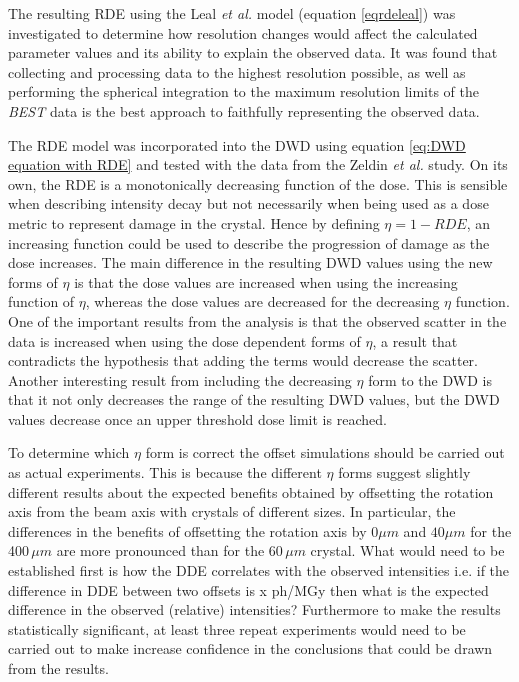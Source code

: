 The resulting RDE using the Leal \textit{et al.}  model (equation \ref{eqrdeleal}) was investigated to determine how resolution changes would affect the calculated parameter values and its ability to explain the observed data.
It was found that collecting and processing data to the highest resolution possible, as well as performing the spherical integration to the maximum resolution limits of the \textit{BEST} data is the best approach to faithfully representing the observed data.

The RDE model was incorporated into the DWD using equation \ref{eq:DWD equation with RDE} and tested with the data from the Zeldin \textit{et al.} study.
On its own, the RDE is a monotonically decreasing function of the dose.
This is sensible when describing intensity decay but not necessarily when being used as a dose metric to represent damage in the crystal.
Hence by defining $\eta = 1 - RDE$, an increasing function could be used to describe the progression of damage as the dose increases.
The main difference in the resulting DWD values using the new forms of $\eta$ is that the dose values are increased when using the increasing function of $\eta$, whereas the dose values are decreased for the decreasing $\eta$ function.
One of the important results from the analysis is that the observed scatter in the data is increased when using the dose dependent forms of $\eta$, a result that contradicts the hypothesis that adding the terms would decrease the scatter.
Another interesting result from including the decreasing $\eta$ form to the DWD is that it not only decreases the range of the resulting DWD values, but the DWD values decrease once an upper threshold dose limit is reached.

To determine which $\eta$ form is correct the offset simulations should be carried out as actual experiments.
This is because the different $\eta$ forms suggest slightly different results about the expected benefits obtained by offsetting the rotation axis from the beam axis with crystals of different sizes.
In particular, the differences in the benefits of offsetting the rotation axis by 0$\mu m$ and $40\mu m$ for the 400$\,\mu m$ are more pronounced than for the 60$\,\mu m$ crystal.
What would need to be established first is how the DDE correlates with the observed intensities i.e. if the difference in DDE between two offsets is x ph/MGy then what is the expected difference in the observed (relative) intensities?
Furthermore to make the results statistically significant, at least three repeat experiments would need to be carried out to make increase confidence in the conclusions that could be drawn from the results.

